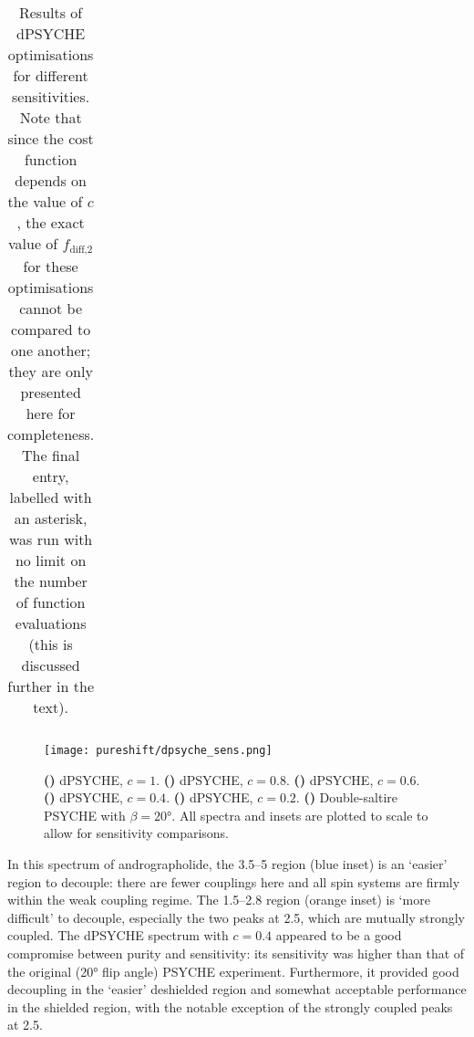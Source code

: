 \begin{table}[htb]
\begin{tabular}{cccc}
        \bottomrule
    \end{tabular}
    \caption[dPSYCHE optimisation results for different sensitivities]{
        Results of dPSYCHE optimisations for different sensitivities.
        Note that since the cost function depends on the value of $c$, the exact value of $f_\text{diff,2}$ for these optimisations cannot be compared to one another; they are only presented here for completeness.
        The final entry, labelled with an asterisk, was run with no limit on the number of function evaluations (this is discussed further in the text).
    }
    \label{tbl:dpsyche_sens}
\end{table}

\begin{figure}[htbp]
    \centering
    \texttt{[image: pureshift/dpsyche\_sens.png]}%
    {\label{fig:dpsyche_sens_d1}}%
    {\label{fig:dpsyche_sens_d0p8}}%
    {\label{fig:dpsyche_sens_d0p6}}%
    {\label{fig:dpsyche_sens_d0p4}}%
    {\label{fig:dpsyche_sens_d0p2}}%
    {\label{fig:dpsyche_sens_p}}%
    \caption[dPSYCHE optimisations with different sensitivities]{
        \textbf{()} dPSYCHE, $c = 1$.
        \textbf{()} dPSYCHE, $c = 0.8$.
        \textbf{()} dPSYCHE, $c = 0.6$.
        \textbf{()} dPSYCHE, $c = 0.4$.
        \textbf{()} dPSYCHE, $c = 0.2$.
        \textbf{()} Double-saltire PSYCHE with $\beta = \ang{20}$.
        All spectra and insets are plotted to scale to allow for sensitivity comparisons.
    }
    \label{fig:dpsyche_sens}
\end{figure}

In this spectrum of andrographolide, the \qtyrange{3.5}{5}{\ppm} region (blue inset) is an `easier' region to decouple: there are fewer couplings here and all spin systems are firmly within the weak coupling regime.
The \qtyrange{1.5}{2.8}{\ppm} region (orange inset) is `more difficult' to decouple, especially the two peaks at \qty{2.5}{\ppm}, which are mutually strongly coupled.
The dPSYCHE spectrum with $c = 0.4$ appeared to be a good compromise between purity and sensitivity: its sensitivity was higher than that of the original (\ang{20} flip angle) PSYCHE experiment.
Furthermore, it provided good decoupling in the `easier' deshielded region and somewhat acceptable performance in the shielded region, with the notable exception of the strongly coupled peaks at \qty{2.5}{\ppm}.


